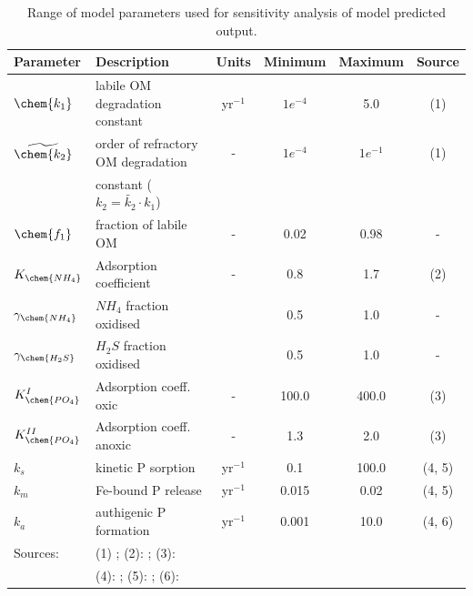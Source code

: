 \documentclass[gmd, manuscript]{copernicus}
\begin{document}
\begin{table}[btp]
\caption{Range of model parameters used for sensitivity analysis of model predicted output.} 
\centering
\begin{tabular}{l l c c c c}
\hline\hline
Parameter & Description & Units & Minimum  & Maximum & Source\\
\hline
$\chem{k_1}$ & labile OM degradation constant & yr$^{-1}$ & $1e^{-4}$ & 5.0 & (1)\\
$\widetilde{\chem{k_2}}$ & order of refractory OM degradation & - & $1e^{-4}$ & $1e^{-1}$ &  (1)\\
 & constant ($k_2 = \widetilde{k_2} \cdot k_1$) & & &  &\\
$\chem{f_1}$ & fraction of labile OM & - & 0.02 & 0.98  & - \\
$K_{\chem{NH_4}}$ & Adsorption coefficient & - & 0.8 & 1.7  & (2) \\
$\gamma_\chem{NH_4}$ & $NH_4$ fraction oxidised &  & 0.5 & 1.0 & - \\
$\gamma_\chem{H_2S}$ &  $H_2S$ fraction oxidised  &  & 0.5 & 1.0 & - \\
$K_\chem{PO_4}^I$ & Adsorption coeff. oxic & - & 100.0 & 400.0  & (3) \\
$K_\chem{PO_4}^{II}$ & Adsorption coeff. anoxic & - & 1.3 & 2.0 & (3) \\
$k_{s}$ & kinetic P sorption & yr$^{-1}$  & 0.1 & 100.0 & (4, 5)\\
$k_{m}$ & Fe-bound P release & yr$^{-1}$  & 0.015 & 0.02 & (4, 5)\\
$k_{a}$ & authigenic P formation & yr$^{-1}$  & 0.001 & 10.0 & (4, 6)\\
\hline
Sources: &\multicolumn{5}{l}{(1) \citet{arndt_quantifying_2013}; (2): \citet{cappellen_cycling_1996}; (3): \citet{krom_adsorption_1980}}\\
&\multicolumn{5}{l}{(4): \citet{gypens_simple_2008}; (5): \citet{caroline_p_slomp_key_1996}; (6): \citet{cappellen_mathematical_1988}}
\end{tabular}
\label{table:SA_parameter_ranges}
\end{table}
\end{document}
